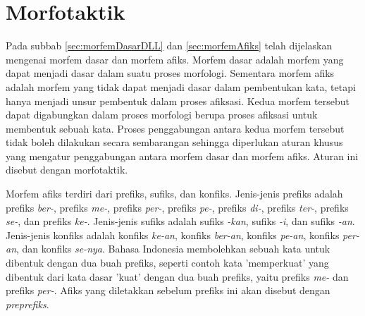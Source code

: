 %
%


\section{Morfotaktik}
\label{sec:morfotaktik}

Pada subbab \ref{sec:morfemDasarDLL} dan \ref{sec:morfemAfiks} telah dijelaskan mengenai morfem dasar dan morfem afiks. Morfem dasar adalah morfem yang dapat menjadi dasar dalam suatu proses morfologi. Sementara morfem afiks adalah morfem yang tidak dapat menjadi dasar dalam pembentukan kata, tetapi hanya menjadi unsur pembentuk dalam proses afiksasi. Kedua morfem tersebut dapat digabungkan dalam proses morfologi berupa proses afiksasi untuk membentuk sebuah kata. Proses penggabungan antara kedua morfem tersebut tidak boleh dilakukan secara sembarangan sehingga diperlukan aturan khusus yang mengatur penggabungan antara morfem dasar dan morfem afiks. Aturan ini disebut dengan morfotaktik. 

Morfem afiks terdiri dari prefiks, sufiks, dan konfiks. Jenis-jenis prefiks adalah prefiks \textit{ber-}, prefiks \textit{me-}, prefiks \textit{per-}, prefiks \textit{pe-}, prefiks \textit{di-}, prefiks \textit{ter-}, prefiks \textit{se-}, dan prefiks \textit{ke-}. Jenis-jenis sufiks adalah sufiks \textit{-kan}, sufiks \textit{-i}, dan sufiks \textit{-an}. Jenis-jenis konfiks adalah konfiks \textit{ke-an}, konfiks \textit{ber-an}, konfiks \textit{pe-an}, konfiks \textit{per-an}, dan konfiks \textit{se-nya}. Bahasa Indonesia membolehkan sebuah kata untuk dibentuk dengan dua buah prefiks, seperti contoh kata 'memperkuat' yang dibentuk dari kata dasar 'kuat' dengan dua buah prefiks, yaitu prefiks \textit{me-} dan prefiks \textit{per-}. Afiks yang diletakkan sebelum prefiks ini akan disebut dengan \textit{preprefiks}. 

